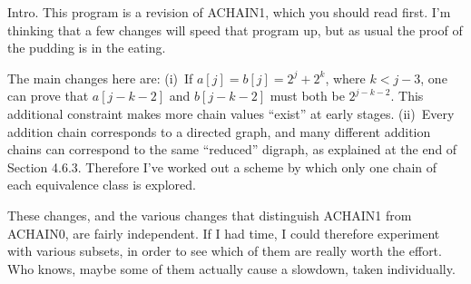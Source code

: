 
\datethis

Intro. This program is a revision of {\mc ACHAIN1}, which you should
read first. I'm thinking that a few changes will speed that program up,
but as usual the proof of the pudding is in the eating.

The main changes here are:
(i)~If $a[j]=b[j]=2^j+2^k$, where $k<j-3$, one can
prove that $a[j-k-2]$ and $b[j-k-2]$ must both be $2^{j-k-2}$.
This additional constraint makes more chain values ``exist'' at
early stages.
(ii)~Every addition chain corresponds to a directed graph, and many different
addition chains can correspond to the same ``reduced'' digraph, as explained
at the end of Section 4.6.3. Therefore I've worked out a scheme by which
only one chain of each equivalence class is explored.

These changes, and the various changes that distinguish {\mc ACHAIN1}
from {\mc ACHAIN0}, are fairly independent. If I had time, I could therefore
experiment with various subsets, in order to see which of them are
really worth the effort. Who knows, maybe some of them actually
cause a slowdown, taken individually.

